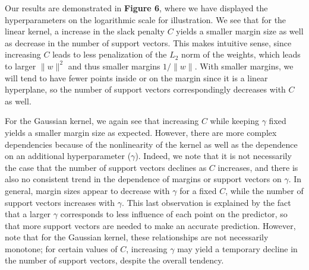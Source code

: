 \documentclass[10pt,psamsfonts]{amsart}
\theoremstyle{definition}
\theoremstyle{remark}
\numberwithin{equation}{section}
\begin{document}
Our results are demonstrated in {\bf Figure 6}, where we have displayed the hyperparameters on the logarithmic scale for illustration. We see that for the linear kernel, a increase in the slack penalty $C$ yields a smaller margin size as well as decrease in the number of support vectors. This makes intuitive sense, since increasing $C$ leads to less penalization of the $L_2$ norm of the weights, which leads to larger $\|w\|^2$ and thus smaller margins $1/\|w\|$. With smaller margins, we will tend to have fewer points inside or on the margin since it is a linear hyperplane, so the number of support vectors correspondingly decreases with $C$ as well.

For the Gaussian kernel, we again see that increasing $C$ while keeping $\gamma$ fixed yields a smaller margin size as expected. However, there are more complex dependencies because of the nonlinearity of the kernel as well as the dependence on an additional hyperparameter ($\gamma$). Indeed, we note that it is not necessarily the case that the number of support vectors declines as $C$ increases, and there is also no consistent trend in the dependence of margins or support vectors on $\gamma$. In general, margin sizes appear to decrease with $\gamma$ for a fixed $C$, while the number of support vectors increases with $\gamma$. This last observation is explained by the fact that a larger $\gamma$ corresponds to less influence of each point on the predictor, so that more support vectors are needed to make an accurate prediction. However, note that for the Gaussian kernel, these relationships are not necessarily monotone; for certain values of $C$, increasing $\gamma$ may yield a temporary decline in the number of support vectors, despite the overall tendency.
\end{document}
